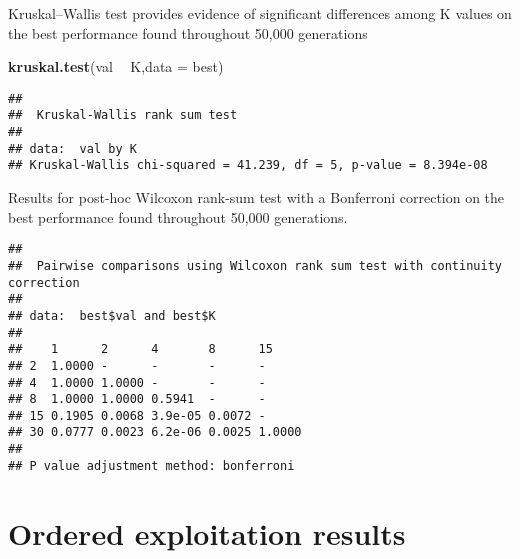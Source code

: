 \documentclass[]{book}
\newenvironment{Shaded}{\begin{snugshade}}{\end{snugshade}}
\newcommand{\DataTypeTok}[1]{\textcolor[rgb]{0.13,0.29,0.53}{#1}}
\newcommand{\KeywordTok}[1]{\textcolor[rgb]{0.13,0.29,0.53}{\textbf{#1}}}
\newcommand{\NormalTok}[1]{#1}
\newcommand{\OperatorTok}[1]{\textcolor[rgb]{0.81,0.36,0.00}{\textbf{#1}}}
\newcommand{\OtherTok}[1]{\textcolor[rgb]{0.56,0.35,0.01}{#1}}
\newcommand{\StringTok}[1]{\textcolor[rgb]{0.31,0.60,0.02}{#1}}
\begin{document}
Kruskal--Wallis test provides evidence of significant differences among K values on the best performance found throughout 50,000 generations

\begin{Shaded}
\begin{Highlighting}[]
\KeywordTok{kruskal.test}\NormalTok{(val }\OperatorTok{~}\StringTok{ }\NormalTok{K,}\DataTypeTok{data =}\NormalTok{ best)}
\end{Highlighting}
\end{Shaded}

\begin{verbatim}
## 
##  Kruskal-Wallis rank sum test
## 
## data:  val by K
## Kruskal-Wallis chi-squared = 41.239, df = 5, p-value = 8.394e-08
\end{verbatim}

Results for post-hoc Wilcoxon rank-sum test with a Bonferroni correction on the best performance found throughout 50,000 generations.

\begin{Shaded}
\end{Shaded}

\begin{verbatim}
## 
##  Pairwise comparisons using Wilcoxon rank sum test with continuity correction 
## 
## data:  best$val and best$K 
## 
##    1      2      4       8      15    
## 2  1.0000 -      -       -      -     
## 4  1.0000 1.0000 -       -      -     
## 8  1.0000 1.0000 0.5941  -      -     
## 15 0.1905 0.0068 3.9e-05 0.0072 -     
## 30 0.0777 0.0023 6.2e-06 0.0025 1.0000
## 
## P value adjustment method: bonferroni
\end{verbatim}

\hypertarget{ordered-exploitation-results-6}{%
\section{Ordered exploitation results}\label{ordered-exploitation-results-6}}
\end{document}
